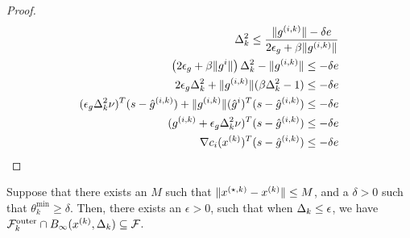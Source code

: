 \begin{proof}

\begin{align*}
\Delta_k^2 \le \frac{\|{g^{(i, k)}}\| -\delta e } {2\epsilon_{g} + \beta \|{g^{(i, k)}}\|} \\
\left(2\epsilon_{g} + \beta \|g^i\|\right)\Delta_k^2 - \|{g^{(i, k)}}\|\le -\delta e \\
2\epsilon_{g}\Delta_k^2 + \|{g^{(i, k)}}\|(\beta \Delta_k^2 - 1)\le -\delta e \\
(\epsilon_{g}\Delta_k^2\nu)^T (s - {{\hat g}^{(i, k)}}) + \|{g^{(i, k)}}\|({\hat g}^i)^T(s - {{\hat g}^{(i, k)}})\le -\delta e \\
({g^{(i, k)}} + \epsilon_{g}\Delta_k^2\nu)^T (s - {{\hat g}^{(i, k)}}) \le -\delta e \\
\nabla c_i({x^{(k)}})^T (s - {{\hat g}^{(i, k)}}) \le -\delta e
\end{align*}


\end{proof}


\begin{theorem}
Suppose that there exists an $M$ such that $\|{x^{(\star, k)}} - {x^{(k)}}\| \le M$, and a $\delta > 0$ such that $\theta^{\text{min}}_k \ge \delta$.
Then, there exists an $\epsilon > 0$, such that when $\Delta_k \le \epsilon$, we have $ {\mathcal {F}^{\text{outer}}_k} \cap B_{\infty}({x^{(k)}}, \Delta_k) \subseteq \mathcal F$.
\end{theorem}

